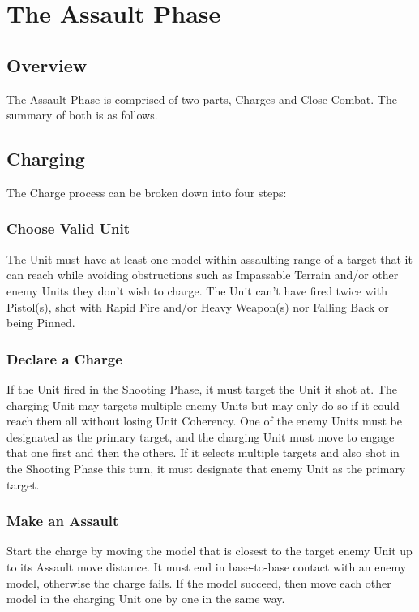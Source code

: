
\chapter{The Assault Phase}

\section{Overview}

The Assault Phase is comprised of two parts, Charges and
Close Combat. The summary of both is as follows.

\section{Charging}
The Charge process can be broken down into four steps:

\countsubsections

\subsection{Choose Valid Unit}
The Unit must have at least one model within assaulting range
of a target that it can reach while avoiding obstructions such as
Impassable Terrain and/or other enemy Units they don't wish
to charge. The Unit can't have fired twice with Pistol(s), shot
with Rapid Fire and/or Heavy Weapon(s) nor Falling Back or
being Pinned.

\subsection{Declare a Charge}

If the Unit fired in the Shooting Phase, it must target the Unit it
shot at. The charging Unit may targets multiple enemy Units
but may only do so if it could reach them all without losing Unit
Coherency. One of the enemy Units must be designated as
the primary target, and the charging Unit must move to engage
that one first and then the others. If it selects multiple targets
and also shot in the Shooting Phase this turn, it must
designate that enemy Unit as the primary target.

\subsection{Make an Assault}
Start the charge by moving the model that is closest to the
target enemy Unit up to its Assault move distance. It must end
in base-to-base contact with an enemy model, otherwise the
charge fails. If the model succeed, then move each other
model in the charging Unit one by one in the same way.

